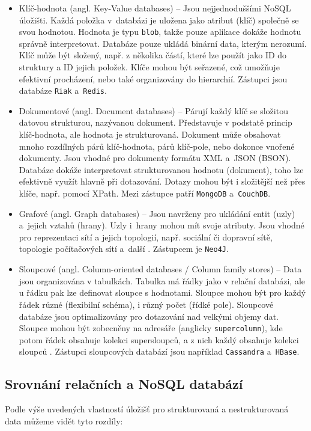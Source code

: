 \begin{itemize}
    \item Klíč-hodnota (angl. Key-Value databases) -- Jsou nejjednoduššími NoSQL úložišti. Každá položka v~databázi je uložena jako atribut (klíč) společně se svou hodnotou. Hodnota je typu \texttt{blob}, takže pouze aplikace dokáže hodnotu správně interpretovat. Databáze pouze ukládá binární data, kterým nerozumí. Klíč může být složený, např. z několika částí, které lze použít jako ID do struktury a ID jejich položek. Klíče mohou být seřazené, což umožňuje efektivní procházení, nebo také organizovány do hierarchií. Zástupci jsou databáze \texttt{Riak} a~\texttt{Redis}.
    
    \item Dokumentové (angl. Document databases) -- Párují každý klíč se složitou datovou strukturou, nazývanou dokument. Představuje v podstatě princip klíč-hodnota, ale hodnota je strukturovaná. Dokument může obsahovat mnoho rozdílných párů klíč-hodnota, párů klíč-pole, nebo dokonce vnořené dokumenty. Jsou vhodné pro dokumenty formátu XML a~JSON (BSON).
    Databáze dokáže interpretovat strukturovanou hodnotu (dokument), toho lze efektivně využít hlavně při dotazování. Dotazy mohou být i složitější než přes klíče, např. pomocí XPath. Mezi zástupce patří \texttt{MongoDB} a~\texttt{CouchDB}.
    
    \item Grafové (angl. Graph databases) -- Jsou navrženy pro ukládání entit (uzly) a~jejich vztahů (hrany). Uzly i~hrany mohou mít svoje atributy. Jsou vhodné pro reprezentaci sítí a jejich topologií, např. sociální či dopravní sítě, topologie počítačových sítí a~další \cite{noSqlPdb}.
    Zástupcem je \texttt{Neo4J}.
    
    \item Sloupcové (angl. Column-oriented databases / Column family stores) -- Data jsou organizována v tabulkách. Tabulka má řádky jako v relační databázi, ale u řádku pak lze definovat sloupce s hodnotami. Sloupce mohou být pro každý řádek různé (flexibilní schéma), i různý počet (řídké pole). Sloupcové databáze jsou optimalizovány pro dotazování nad velkými objemy dat. Sloupce mohou být zobecněny na adresáře (anglicky \texttt{supercolumn}), kde potom řádek obsahuje kolekci supersloupců, a z nich každý obsahuje kolekci sloupců \cite{noSqlPdb}. Zástupci sloupcových databází jsou například \texttt{Cassandra} a~\texttt{HBase}.
\end{itemize}

\subsection{Srovnání relačních a NoSQL databází}
Podle výše uvedených vlastností úložišť pro strukturovaná a nestrukturovaná data můžeme vidět tyto rozdíly:

